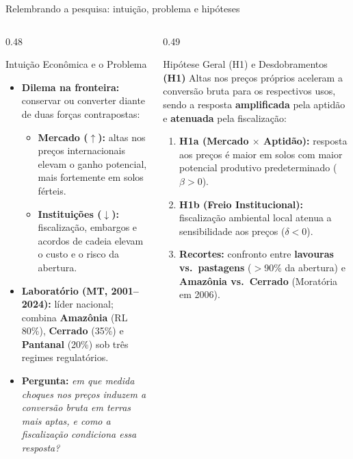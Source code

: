 \documentclass[aspectratio=169,10.5pt]{beamer}
\newcommand{\fonte}[1]{\par\vspace{1mm}{\fontsize{6.5}{7.5}\selectfont\color{gray}Fonte: #1\par}}
\begin{document}
\begin{frame}{Relembrando a pesquisa: intuição, problema e hipóteses}
\begin{columns}[T]
\begin{column}{0.48\textwidth}
\begin{block}{Intuição Econômica e o Problema}
\fontsize{7.8}{9.4}\selectfont
\begin{itemize}
    \setlength{\itemsep}{0.8mm}
    \item \textbf{Dilema na fronteira:} conservar ou converter diante de duas forças contrapostas:
    \begin{itemize}
        \fontsize{7.2}{8.6}\selectfont
        \item \textbf{Mercado ($\uparrow$):} altas nos preços internacionais elevam o ganho potencial, mais fortemente em solos férteis.
        \item \textbf{Instituições ($\downarrow$):} fiscalização, embargos e acordos de cadeia elevam o custo e o risco da abertura.
    \end{itemize}
    \item \textbf{Laboratório (MT, 2001--2024):} líder nacional; combina \textbf{Amazônia} (RL 80\%), \textbf{Cerrado} (35\%) e \textbf{Pantanal} (20\%) sob três regimes regulatórios.
    \item \textbf{Pergunta:} \textit{em que medida choques nos preços induzem a conversão bruta em terras mais aptas, e como a fiscalização condiciona essa resposta?}
\end{itemize}
\end{block}
\end{column}

\begin{column}{0.49\textwidth}
\begin{block}{Hipótese Geral (H1) e Desdobramentos}
\fontsize{7.8}{9.4}\selectfont
\textbf{(H1)} Altas nos preços próprios aceleram a conversão bruta para os respectivos usos, sendo a resposta \textbf{amplificada} pela aptidão e \textbf{atenuada} pela fiscalização:
\vspace{1mm}
\begin{enumerate}
    \setlength{\itemsep}{0.9mm}
    \item \textbf{H1a (Mercado $\times$ Aptidão):} resposta aos preços é maior em solos com maior potencial produtivo predeterminado ($\beta > 0$).
    \item \textbf{H1b (Freio Institucional):} fiscalização ambiental local atenua a sensibilidade aos preços ($\delta < 0$).
    \item \textbf{Recortes:} confronto entre \textbf{lavouras vs.\ pastagens} ($>$90\% da abertura) e \textbf{Amazônia vs.\ Cerrado} (Moratória em 2006).
\end{enumerate}
\end{block}
\end{column}
\end{columns}
\end{frame}
\end{document}

